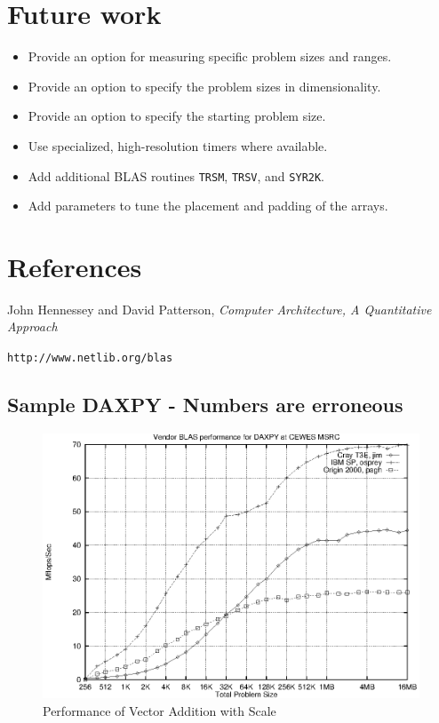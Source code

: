 \documentclass [12pt]{article}
\begin{document}
\section{Future work}

\begin{itemize}
\item Provide an option for measuring specific problem sizes and ranges.
\item Provide an option to specify the problem sizes in dimensionality.
\item Provide an option to specify the starting problem size.
\item Use specialized, high-resolution timers where available.
\item Add additional BLAS routines {\tt TRSM}, {\tt TRSV}, and {\tt SYR2K}.
\item Add parameters to tune the placement and padding of the arrays.
\end{itemize}

\section{References}

John Hennessey and David Patterson, {\em Computer Architecture, A Quantitative Approach}

{\tt http://www.netlib.org/blas}

\clearpage
\newpage

\subsection{Sample DAXPY - Numbers are erroneous}
\begin{figure}[Hht]
\centerline{\includegraphics{pics/cewes_vdaxpy.ps}}
\caption{Performance of Vector Addition with Scale}\label{daxpy}
\end{figure}
\clearpage
\newpage
\end{document}

